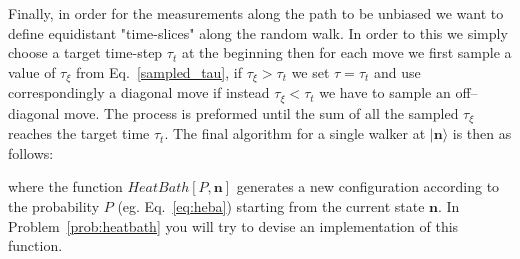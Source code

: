 Finally, in order for the measurements along the path to be unbiased we want to define equidistant "time-slices" along the random walk. In 
order to this we simply choose a target time-step $\tau_t$ at the beginning then for each move we first sample a value of $\tau_{\xi}$ 
from Eq.~\eqref{sampled_tau}, if $\tau_{\xi} > \tau_t$ we set $\tau=\tau_t$ and use correspondingly a diagonal move if instead $\tau_{\xi} < \tau_t$ 
we have to sample an off--diagonal move. The process is preformed until the sum of all the sampled $\tau_{\xi}$ reaches the target time $\tau_t$. 
The final algorithm for a single walker at $\rvert \mathbf{n}\rangle$ is then as follows: 
\begin{algorithmic} 
\Loop
  \If{$\tau_\xi\geq\tau$}
  \EndIf
  \State{$\tau\to\tau-\tau_\xi$}
\EndLoop
\end{algorithmic}
where the function $HeatBath[P,\mathbf{n}]$ generates a new configuration according to the probability $P$ (eg. Eq.~\eqref{eq:heba}) starting 
from the current state $\mathbf{n}$. In Problem~\ref{prob:heatbath} you will try to devise an implementation of this function.

